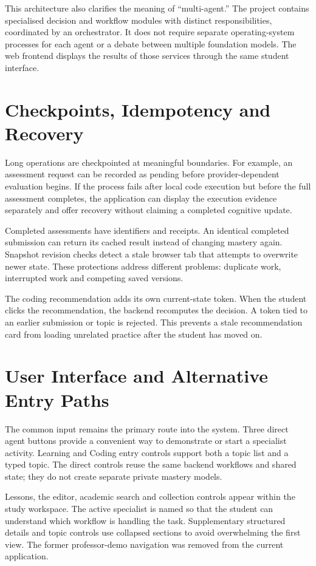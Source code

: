 This architecture also clarifies the meaning of ``multi-agent.'' The project contains specialised decision and workflow modules with distinct responsibilities, coordinated by an orchestrator. It does not require separate operating-system processes for each agent or a debate between multiple foundation models. The web frontend displays the results of those services through the same student interface.

\section{Checkpoints, Idempotency and Recovery}
Long operations are checkpointed at meaningful boundaries. For example, an assessment request can be recorded as pending before provider-dependent evaluation begins. If the process fails after local code execution but before the full assessment completes, the application can display the execution evidence separately and offer recovery without claiming a completed cognitive update.

Completed assessments have identifiers and receipts. An identical completed submission can return its cached result instead of changing mastery again. Snapshot revision checks detect a stale browser tab that attempts to overwrite newer state. These protections address different problems: duplicate work, interrupted work and competing saved versions.

The coding recommendation adds its own current-state token. When the student clicks the recommendation, the backend recomputes the decision. A token tied to an earlier submission or topic is rejected. This prevents a stale recommendation card from loading unrelated practice after the student has moved on.

\section{User Interface and Alternative Entry Paths}
The common input remains the primary route into the system. Three direct agent buttons provide a convenient way to demonstrate or start a specialist activity. Learning and Coding entry controls support both a topic list and a typed topic. The direct controls reuse the same backend workflows and shared state; they do not create separate private mastery models.

Lessons, the editor, academic search and collection controls appear within the study workspace. The active specialist is named so that the student can understand which workflow is handling the task. Supplementary structured details and topic controls use collapsed sections to avoid overwhelming the first view. The former professor-demo navigation was removed from the current application.

